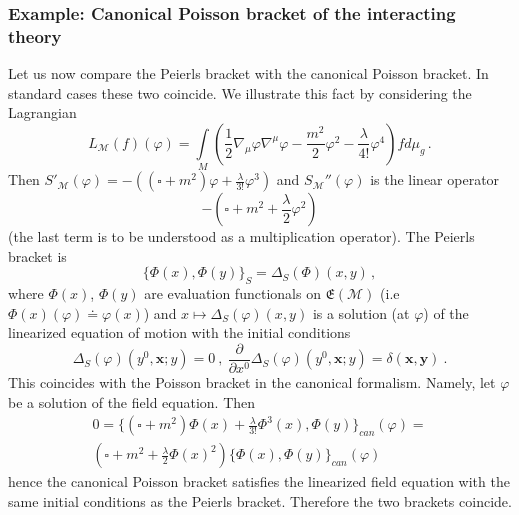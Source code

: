 \documentclass[12pt]{article}
\newcommand{\E}{\mathfrak{E}}
\newcommand{\Mcal}{\mathcal{M}}
\newcommand{\la}{\lambda}
\newcommand{\ph}{\varphi}
\newcommand{\Poi}[2]{\{#1,#2\}}
\newcommand{\1}{\mathds{1}}                         %
\newcommand{\pa}{\partial}                              %
\newcommand{\be}{\begin{equation}}
\newcommand{\ee}{\end{equation}}
\begin{document}
{\subsubsection{Example: Canonical Poisson bracket of the interacting theory}
Let us now compare the Peierls bracket with the canonical Poisson bracket. In standard cases these two coincide. We illustrate this fact by considering the Lagrangian
\[
L_\Mcal(f)(\ph)=\int\limits_M \left(\frac{1}{2}\nabla_\mu\ph\nabla^\mu\ph-\frac{m^2}{2}\ph^2-\frac{\la}{4!}\ph^4\right)fd\mu_g\,.
\]
Then $S'_\Mcal(\ph)=-\left((\square+m^2)\ph+\frac{\lambda}{3!}\ph^3\right)$ and $S_\Mcal''(\ph)$ is the linear operator
\be
-\left(\square +m^2+\frac{\lambda}{2}\ph^2\right)
\ee
(the last term is to be understood as a multiplication operator). The Peierls bracket is
\be
\Poi{\Phi(x)}{\Phi(y)}_S=\Delta_S(\Phi)(x,y)\,,
\ee
where $\Phi(x)$, $\Phi(y)$ are evaluation functionals on $\E(\Mcal)$ (i.e $\Phi(x)(\ph)\doteq \ph(x)$)
and   $x\mapsto \Delta_S(\ph)(x,y)$ is a solution (at $\ph$) of the  linearized equation of motion with the initial conditions
\be
\Delta_S(\ph)(y^0,\mathbf{x};y)=0\ ,\ \frac{\pa}{\pa x^0}\Delta_S(\ph)(y^0,\mathbf{x};y)=\delta(\mathbf{x},\mathbf{y})\ .
\ee
This coincides with the Poisson bracket in the canonical formalism. Namely, let $\ph$ be a solution of the field equation.
Then
\begin{multline}
0=\Big\{(\square +m^2)\Phi(x)+\frac{\lambda}{3!}\Phi^3(x),\Phi(y)\Big\}_
{can}(\ph)=\\
(\square +m^2+\frac{\lambda}{2}\Phi(x)^2)\Big\{\Phi(x),\Phi(y)\Big\}_{can}(\ph)
\end{multline}
hence the canonical Poisson bracket satisfies the linearized field equation with the same initial conditions as the Peierls bracket.  Therefore the two brackets coincide.
}
\end{document}
